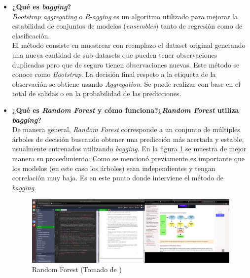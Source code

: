 \begin{itemize}
    \item \textbf{¿Qué es \textit{bagging}?}\\
    
    \textit{Bootstrap aggregating} o \textit{B-agging} es un algoritmo utilizado para mejorar la estabilidad de conjuntos de modelos (\textit{ensembles}) tanto de regresión como de clasificación.\\
    El método consiste en muestrear con reemplazo el dataset original generando una nueva cantidad de sub-datasets que pueden tener observaciones duplicadas pero que de seguro tienen observaciones nuevas. Este método se conoce como \textit{Bootstrap}. La decisión final respeto a la etiqueta de la observación se obtiene usando \textit{Aggregation}. Se puede realizar con base en el total de salidas o en la probabilidad de las predicciones.
    
    \item \textbf{¿Qué es \textit{Random Forest} y cómo funciona?¿\textit{Random Forest} utiliza \textit{bagging}?}\\
    
    De manera general, \textit{Random Forest} corresponde a un conjunto de múltiples árboles de decisión buscando obtener una predicción más acertada y estable, usualmente entrenados utilizando \textit{bagging}. En la figura \ref{fig:RF} se muestra de mejor manera su procedimiento. Como se mencionó previamente es importante que los modelos (en este caso los árboles) sean independientes y tengan correlación muy baja. Es en este punto donde interviene el método de \textit{bagging}.\\
    
    \begin{figure}
        \centering
        \includegraphics[trim={77cm 15cm 20cm 9cm}, clip, scale = 0.5]{doc/images/randomrofest.png}
        \caption{Random Forest (Tomado de \cite{javatpoint})}
        \label{fig:RF}
    \end{figure}
    

\end{itemize}
